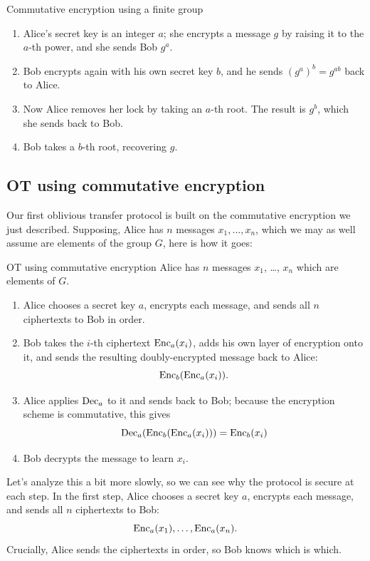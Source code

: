 \begin{algo}{Commutative encryption using a finite group}{}
\begin{enumerate}
\item
  Alice's secret key is an integer $a$; she encrypts a message $g$
  by raising it to the $a$-th power, and she sends Bob $g^{a}$.
\item
  Bob encrypts again with his own secret key $b$, and he sends
  $( g^{a} )^{b} = g^{ab}$ back to Alice.
\item
  Now Alice removes her lock by taking an $a$-th root. The result is
  $g^{b}$, which she sends back to Bob.
\item
  Bob takes a $b$-th root, recovering $g$.
\end{enumerate}
\end{algo}

\subsection{OT using commutative encryption}
Our first oblivious transfer protocol is built on the commutative
encryption we just described.
Supposing, Alice has $n$ messages $x_{1},\ldots,x_{n}$, which we may as well
assume are elements of the group $G$, here is how it goes:

\begin{algo}{OT using commutative encryption}{}
Alice has $n$ messages $x_{1}$, \dots, $x_{n}$ which are elements of $G$.
\begin{enumerate}
\item Alice chooses a secret key $a$, encrypts each message,
  and sends all $n$ ciphertexts to Bob in order.

\item Bob takes the $i$-th ciphertext $\operatorname{Enc}_{a}( x_{i} )$,
  adds his own layer of encryption onto it,
  and sends the resulting doubly-encrypted message back to Alice:
  \[ \operatorname{Enc}_{b}( \operatorname{Enc}_{a}( x_{i} ) ).\]

\item Alice applies $\operatorname{Dec}_{a}$ to it and sends back to Bob;
  because the encryption scheme is commutative, this gives
  \[ \operatorname{Dec}_a( \operatorname{Enc}_{b}( \operatorname{Enc}_{a}( x_{i} ) )) =
      \operatorname{Enc}_{b}( x_{i} ) \]

\item Bob decrypts the message to learn $x_{i}$.
\end{enumerate}
\end{algo}

Let's analyze this a bit more slowly, so we can see why the protocol is secure at each step.
In the first step, Alice chooses a secret key
$a$, encrypts each message, and sends all $n$ ciphertexts to Bob:
\[\operatorname{Enc}_{a}( x_{1}),\ldots,\operatorname{Enc}_{a}( x_{n} ).\]
Crucially, Alice sends the ciphertexts in order, so Bob knows which is which.

